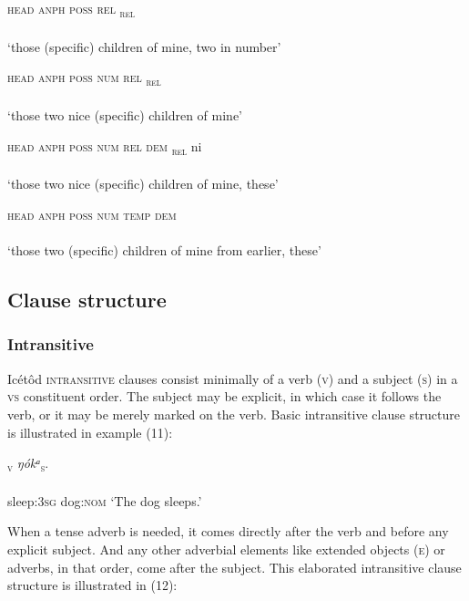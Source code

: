 \textsc{head anph poss rel}
\ea\label{ex:}
\textsc{\textsubscript{rel}}  \\
    \\
\glt ‘those (specific) children of mine, two in number’ 
\z




\textsc{head anph poss num rel}
\ea\label{ex:}
\textsc{\textsubscript{ rel}} \\
    \\
\glt ‘those two nice (specific) children of mine’ 
\z




\textsc{head anph poss num rel dem}
\ea\label{ex:}
\textsc{\textsubscript{ rel}} ni \\
    \\
\glt ‘those two nice (specific) children of mine, these’ 
\z




\textsc{head anph poss num temp dem}
\ea\label{ex:}
 \\
    \\
\glt ‘those two (specific) children of mine from earlier, these’ 
\z






\subsection{Clause structure}
\subsubsection{Intransitive}

Icétôd \textsc{intransitive} clauses consist minimally of a verb (\textsc{v}) and a subject (\textsc{s}) in a \textsc{vs} constituent order. The subject may be explicit, in which case it follows the verb, or it may be merely marked on the verb. Basic intransitive clause structure is illustrated in example (11):




\ea\label{ex:}
\textsc{\textsubscript{v}}\textsc{}    \textit{ŋókᵃ}\textsc{\textsubscript{s}}. \\
    \\
sleep:\textsc{3sg}   dog:\textsc{nom}
\glt ‘The dog sleeps.’ 
\z


When a tense adverb is needed, it comes directly after the verb and before any explicit subject. And any other adverbial elements like extended objects (\textsc{e}) or adverbs, in that order, come after the subject. This elaborated intransitive clause structure is illustrated in (12):



